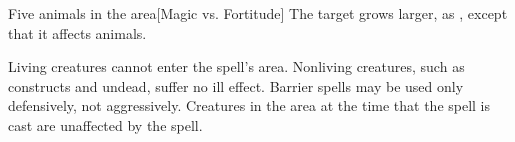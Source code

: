 \begin{spelltarget}{Five animals in the area}[Magic vs. Fortitude]
    \spellsuccess The target grows larger, as , except that it affects animals.
\end{spelltarget}

\begin{comment}
\spellsection{Animate Objects}{5}
\spelldesc{You imbue inanimate objects with mobility and a semblance of life.}
\spellinfo{Trans (Animation)}{Chaos, Trans}
\spelltwocol{\spelllimit{\areamed radius}}{\spellrng{\rngmed}}
\spelltgts{One Small object/level in the area; see text}
\spelldur{\durshort}
\spelleffect Each animated object immediately attacks whomever or whatever you initially designate. Your control of the objects is limited to simple commands (``Attack,'' ``Defend,'' ``Stop,'' and so forth).
\par An animated object can be of any nonmagical material. You may animate one Small or smaller object or an equivalent number of larger objects per caster level. A Medium object counts as two Small or smaller objects, a Large object as four, a Huge object as eight, a Gargantuan object as sixteen, and a Colossal object as thirty-two. You can give the objects new commands as a move action, as normal for directing an active spell.
\spellnotes This spell cannot animate objects carried or worn by a creature. This spell can be made permanent with a \spell{permanency} ritual.

\spellsection{Animate Plants}{5}
\spelldesc{You imbue inanimate plants with mobility and a semblance of life.}
\spellinfo{Trans (Animation)}{Nature, Plant}
\begin{spelltargets}{One Small plant/level in the area; see text}
    \spelleffect This spell functions like \spell{animate objects}, except that you animate plants instead of inanimate objects.
\end{spelltargets}
\spellnotes \spell{Animate plants} cannot affect plant creatures, nor does it affect nonliving vegetable material.
\end{comment}

\spelldur{\durlong \dismissable}
\spellline
\spelleffect Living creatures cannot enter the spell's area. Nonliving creatures, such as constructs and undead, suffer no ill effect.
\spellnotes Barrier spells may be used only defensively, not aggressively. Creatures in the area at the time that the spell is cast are unaffected by the spell.

